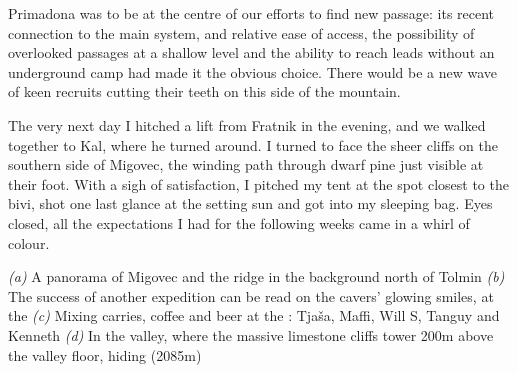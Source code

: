 Primadona was to be at the centre of our efforts to find new passage: its recent connection to the main system, and relative ease of access, the possibility of overlooked passages at a shallow level and the ability to reach leads without an underground camp had made it the obvious choice. There would be a new wave of keen recruits cutting their teeth on this side of the mountain. 

The very next day I hitched a lift from Fratnik in the evening, and we walked together to Kal, where he turned around. I turned to face the sheer cliffs on the southern side of Migovec, the winding path through dwarf pine just visible at their foot. With a sigh of satisfaction, I pitched my tent at the spot closest to the bivi, shot one last glance at the setting sun and got into my sleeping bag. Eyes closed, all the expectations I had for the following weeks came in a whirl of colour.


\begin{pagefigure}
\checkoddpage \ifoddpage \forcerectofloat \else \forceversofloat \fi
   \centering
    \begin{subfigure}[t]{\textwidth}
    \centering
        \caption{} \label{Panoramafrom tolmin}
    \end{subfigure}
    \begin{subfigure}[t]{0.45\textwidth}
        \centering
        \caption{} \label{selfie}
    \end{subfigure}
    \begin{subfigure}[t]{0.53\textwidth}
        \centering
        \caption{} \label{Kal}
    \end{subfigure}
  \hfill
    \centering
    \begin{subfigure}[t]{\textwidth}
        \centering
        \caption{} \label{limestone cliffs}
    \end{subfigure}
  

    \caption{
    \emph{(a)} A panorama of Migovec and the \protect{} ridge in the background
north of Tolmin 
\emph{(b)} The success of another expedition can be read on the cavers' glowing smiles, at the \protect{} 
    \emph{(c)} Mixing carries, coffee and beer at the \protect{}: Tja\v{s}a, Maffi, Will S, Tanguy and Kenneth 
    \emph{(d)} In the \protect{} valley, where the massive limestone cliffs tower 200m above the valley floor, hiding \protect{} (2085m) 
    }
\end{pagefigure}